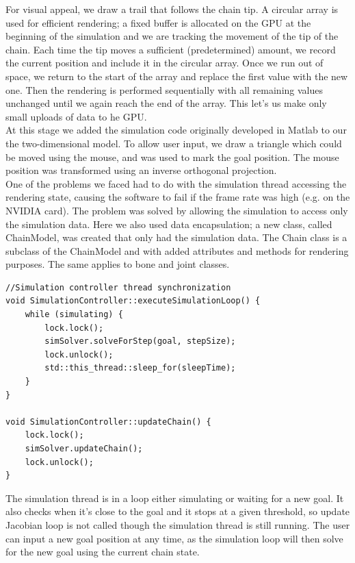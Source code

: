 \documentclass[paper=a4, fontsize=11pt]{scrartcl} %
\numberwithin{equation}{section} %
\numberwithin{figure}{section} %
\numberwithin{table}{section} %
\begin{document}
For visual appeal, we draw a trail that follows the chain tip. A circular array is used for efficient rendering; a fixed buffer is allocated on the GPU at the beginning of the simulation and we are tracking the movement of the tip of the chain. Each time the tip moves a sufficient (predetermined) amount, we record the current position and include it in the circular array. Once we run out of space, we return to the start of the array and replace the first value with the new one. Then the rendering is performed sequentially with all remaining values unchanged until we again reach the end of the array. This let's us make only small uploads of data to he GPU. \\

At this stage we added the simulation code originally developed in Matlab to our the two-dimensional model. To allow user input, we draw a triangle which could be moved using the mouse, and was used to mark the goal position. The mouse position was transformed using an inverse orthogonal projection. \\

One of the problems we faced had to do with the simulation thread accessing the rendering state, causing the software to fail if the frame rate was high (e.g. on the NVIDIA card). The problem was solved by allowing the simulation to access only the simulation data. Here we also used data encapsulation; a new class, called ChainModel, was created that only had the simulation data. The Chain class is a subclass of the ChainModel and with added attributes and methods for rendering purposes. The same applies to bone and joint classes. \\

\begin{mdframed}
\begin{scriptsize}
\begin{lstlisting}
//Simulation controller thread synchronization		
void SimulationController::executeSimulationLoop() {
	while (simulating) {
		lock.lock();
		simSolver.solveForStep(goal, stepSize);
		lock.unlock();
		std::this_thread::sleep_for(sleepTime);
	}
}

void SimulationController::updateChain() {
	lock.lock();
	simSolver.updateChain();
	lock.unlock();
}
\end{lstlisting}
\end{scriptsize}
\end{mdframed}

The simulation thread is in a loop either simulating or waiting for a new goal. It also checks when it's close to the goal and it stops at a given threshold, so update Jacobian loop is not called though the simulation thread is still running. The user can input a new goal position at any time, as the simulation loop will then solve for the new goal using the current chain state.\\
\end{document}
